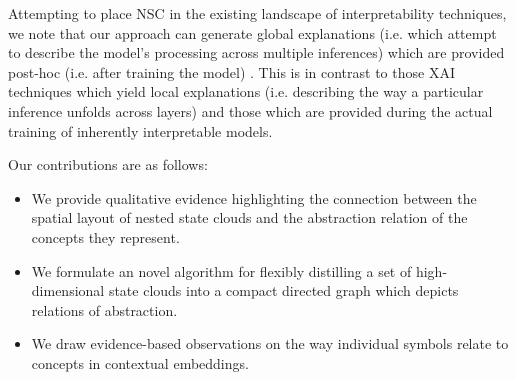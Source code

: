 Attempting to place NSC in the existing landscape of interpretability techniques, we note that our approach can generate global explanations (i.e. which attempt to describe the model's processing across multiple inferences) which are provided post-hoc (i.e. after training the model) \citep{danilevsky_survey_nodate}. This is in contrast to those XAI techniques which yield local explanations (i.e. describing the way a particular inference unfolds across layers) and those which are provided during the actual training of inherently interpretable models. 

Our contributions are as follows:

\begin{itemize}
    \item We provide qualitative evidence highlighting the connection between the spatial layout of nested state clouds and the abstraction relation of the concepts they represent.
    \item We formulate an novel algorithm for flexibly distilling a set of high-dimensional state clouds into a compact directed graph which depicts relations of abstraction.
    \item We draw evidence-based observations on the way individual symbols relate to concepts in contextual embeddings.
\end{itemize}